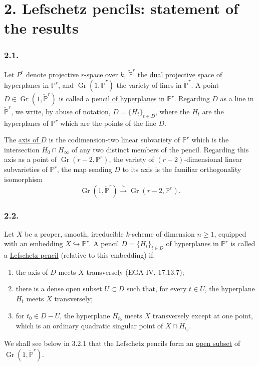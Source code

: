 \section*{2. Lefschetz pencils: statement of the results}

\subsubsection*{2.1.}
Let $P^r$ denote projective $r$-space over $k$,
$\check{\mathbb P}^{r}$ the \underline{dual} projective space of
hyperplanes in $\mathbb P^r$, and
$\operatorname{Gr}(1,\check{\mathbb P}^{r})$ the variety of lines in
$\check{\mathbb P}^{r}$.  A point
$D\in\operatorname{Gr}(1,\check{\mathbb P}^{r})$ is called a
\underline{pencil of hyperplanes} in $\mathbb P^r$.  Regarding $D$ as
a line in $\check{\mathbb P}^{r}$, we write, by abuse of notation,
$D=\{H_t\}_{t\in D}$, where the $H_t$ are the hyperplanes of
$\mathbb P^r$ which are the points of the line $D$.

The \underline{axis of $D$} is the codimension-two linear subvariety
of $\mathbb P^r$ which is the intersection $H_0\cap H_\infty$ of any
two distinct members of the pencil.  Regarding this axis as a point
of $\operatorname{Gr}(r-2,\mathbb P^r)$, the variety of
$(r-2)$-dimensional linear subvarieties of $\mathbb P^r$, the map
sending $D$ to its axis is the familiar orthogonality isomorphism
\[
\operatorname{Gr}(1,\check{\mathbb P}^{r})
\xrightarrow{\ \sim\ }
\operatorname{Gr}(r-2,\mathbb P^r).
\]

\subsubsection*{2.2.}
Let $X$ be a proper, smooth, irreducible $k$-scheme of dimension
$n\geq1$, equipped with an embedding $X\hookrightarrow\mathbb P^r$.
A pencil $D=\{H_t\}_{t\in D}$ of hyperplanes in $\mathbb P^r$ is
called a \underline{Lefschetz pencil} (relative to this embedding) if:
\begin{enumerate}
\item[(a)] the axis of $D$ meets $X$ transversely (EGA IV, 17.13.7);
\item[(b)] there is a dense open subset $U\subset D$ such that, for
every $t\in U$, the hyperplane $H_t$ meets $X$ transversely;
\item[(c)] for $t_0\in D-U$, the hyperplane $H_{t_0}$ meets $X$
transversely except at one point, which is an ordinary quadratic
singular point of $X\cap H_{t_0}$.
\end{enumerate}
We shall see below in 3.2.1 that the Lefschetz pencils form an
\underline{open subset} of
$\operatorname{Gr}(1,\check{\mathbb P}^{r})$.

